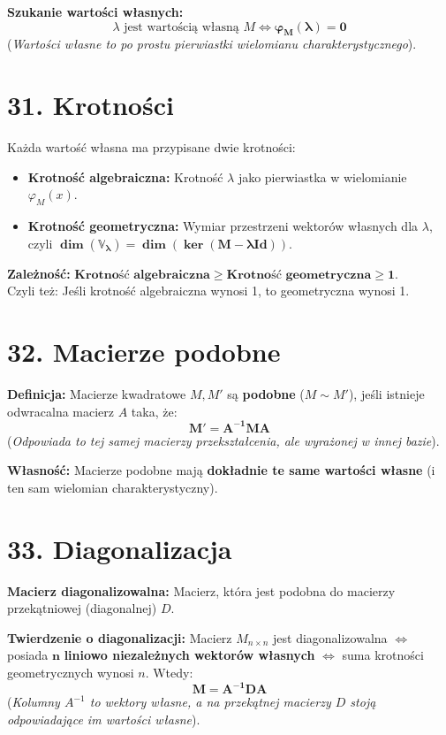 \documentclass[12pt,a4paper]{article}
\begin{document}
\noindent\textbf{Szukanie wartości własnych:} %
$$ \lambda \text{ jest wartością własną } M \iff \mathbf{\varphi_M(\lambda) = 0} $$ %
(\textit{Wartości własne to po prostu pierwiastki wielomianu charakterystycznego}). %

\section*{31. Krotności}
Każda wartość własna ma przypisane dwie krotności: %
\begin{itemize}
    \item \textbf{Krotność algebraiczna:} Krotność $\lambda$ jako pierwiastka w wielomianie $\varphi_M(x)$. %
    \item \textbf{Krotność geometryczna:} Wymiar przestrzeni wektorów własnych dla $\lambda$, czyli $\mathbf{\dim(\mathbb{V}_\lambda) = \dim(\ker(M - \lambda Id))}$. %
\end{itemize}
\noindent\textbf{Zależność:} $\mathbf{\text{Krotność algebraiczna} \ge \text{Krotność geometryczna} \ge 1}$. \\ Czyli też: Jeśli krotność algebraiczna wynosi 1, to geometryczna wynosi 1.%

\section*{32. Macierze podobne}
\noindent\textbf{Definicja:} Macierze kwadratowe $M, M'$ są \textbf{podobne} ($M \sim M'$), jeśli istnieje odwracalna macierz $A$ taka, że: %
$$ \mathbf{M' = A^{-1} M A} $$ %
(\textit{Odpowiada to tej samej macierzy przekształcenia, ale wyrażonej w innej bazie}). %

\noindent\textbf{Własność:} Macierze podobne mają \textbf{dokładnie te same wartości własne} (i ten sam wielomian charakterystyczny). %

\section*{33. Diagonalizacja}
\noindent\textbf{Macierz diagonalizowalna:} Macierz, która jest podobna do macierzy przekątniowej (diagonalnej) $D$. %

\noindent\textbf{Twierdzenie o diagonalizacji:} Macierz $M_{n \times n}$ jest diagonalizowalna $\iff$ posiada $\mathbf{n}$ \textbf{liniowo niezależnych wektorów własnych} $\iff$ suma krotności geometrycznych wynosi $n$. %
Wtedy:
$$ \mathbf{M = A^{-1} D A} $$ %
(\textit{Kolumny $A^{-1}$ to wektory własne, a na przekątnej macierzy $D$ stoją odpowiadające im wartości własne}). %
\end{document}
